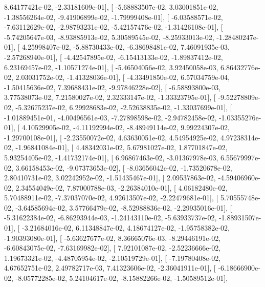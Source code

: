 \documentclass{article}
\begin{document}
          8.64177421e-02,  -2.33181609e-01],
       [ -5.68883507e-02,   3.03001851e-02,  -1.38556264e-02,
         -9.41906899e-02,  -1.79999408e-01],
       [ -6.03588571e-02,  -7.63112629e-02,  -2.98793231e-02,
         -5.42157476e-02,  -1.31426108e-01],
       [ -5.74205647e-03,  -8.93885913e-02,   5.30589545e-02,
         -8.25933013e-02,  -1.28480247e-01],
       [  4.25998407e-02,  -5.88730433e-02,  -6.38698481e-02,
          7.46091935e-03,  -2.57268940e-01],
       [ -4.42547895e-02,  -6.15413133e-02,  -1.89837412e-02,
          6.23169457e-02,  -1.10571274e-01],
       [ -5.46504056e-02,   3.92450058e-03,   6.86432776e-02,
          2.03031752e-02,  -1.41328036e-01],
       [ -4.33491850e-02,   6.57034759e-04,  -1.50415636e-02,
          7.39688431e-02,  -9.97846228e-02],
       [ -6.58893800e-03,   3.77538073e-02,   7.21580027e-02,
          2.32333147e-02,  -1.33323795e-01],
       [ -9.52278809e-02,  -5.32675237e-02,   6.29928683e-02,
         -2.52638835e-02,  -1.33037699e-01],
       [ -1.01889451e-01,  -4.00496561e-03,  -7.27898598e-02,
         -2.94782458e-02,  -1.03355276e-01],
       [  4.10529905e-02,  -4.11192994e-02,  -8.48949114e-02,
          9.99224307e-02,  -1.29700108e-01],
       [ -2.23550072e-02,   4.63630051e-02,   4.54954925e-02,
          4.97238314e-02,  -1.96841084e-01],
       [  4.48342031e-02,   5.67981027e-02,   1.87701847e-02,
          5.93254405e-02,  -1.41732174e-01],
       [  6.96867463e-02,  -3.01367978e-03,   6.55679997e-02,
          3.66158453e-02,  -9.07373653e-02],
       [ -8.03656042e-02,  -1.73520678e-02,   2.80410731e-02,
          3.02242952e-02,  -1.51435467e-01],
       [  2.09537863e-02,  -4.59406960e-02,   2.34554049e-02,
          7.87000788e-03,  -2.26384010e-01],
       [  4.06182480e-02,   5.70488911e-02,  -7.37037070e-02,
          4.92613507e-02,  -2.22479681e-01],
       [  5.70555748e-02,  -3.64585694e-02,   3.57766479e-02,
         -8.52988836e-02,  -2.29935016e-01],
       [ -5.31622384e-02,  -6.86293944e-03,  -1.24143110e-02,
         -5.63933737e-02,  -1.88931507e-01],
       [ -3.21684016e-02,   6.11348847e-02,   4.18674127e-02,
         -1.95758382e-02,  -1.90393080e-01],
       [ -5.63627677e-02,   8.36665076e-03,  -8.29446191e-02,
         -6.60843075e-02,  -7.63169982e-02],
       [  7.92101087e-02,  -2.52236666e-02,   1.19673321e-02,
         -4.48705954e-02,  -2.10519729e-01],
       [ -7.19780408e-02,   4.67652751e-02,   2.49782717e-03,
          7.41323606e-02,  -2.36041911e-01],
       [ -6.18666900e-02,  -8.05772285e-02,   5.24104617e-02,
         -8.15882266e-02,  -1.50589512e-01],
\end{document}
